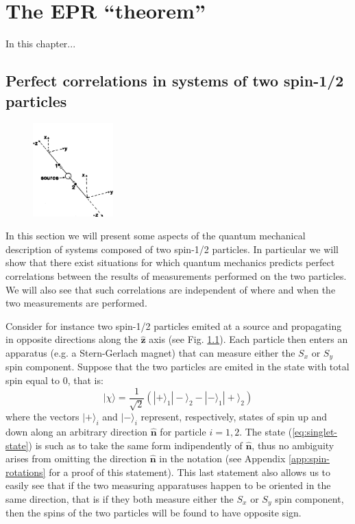 \chapter{The EPR ``theorem''}

In this chapter...

\section{Perfect correlations in systems of two spin-1/2 particles}

\begin{figure}
  \centering
  \includegraphics[width=0.275\textwidth]{Mainmatter/Chapter1/eprb-gedankenexperiment.png}
  \caption{}
  \label{fig:eprb-gedankenexperiment}
\end{figure}

In this section we will present some aspects of the quantum mechanical description of systems composed of two spin-1/2 particles. In particular we will show that there exist situations for which quantum mechanics predicts perfect correlations between the results of measurements performed on the two particles. We will also see that such correlations are independent of where and when the two measurements are performed.%

Consider for instance two spin-1/2 particles emited at a source and propagating in opposite directions along the $\mathbf{\hat{z}}$ axis (see Fig. \ref{fig:eprb-gedankenexperiment}).  Each particle then enters an apparatus (e.g. a Stern-Gerlach magnet) that can measure either the $S_x$ or $S_y$ spin component. Suppose that the two particles are emited in the state with total spin equal to $0$, that is:
\begin{equation}
  |\chi\rangle = \frac{1}{\sqrt{2}} \left( |+\rangle_1 |-\rangle_2 - |-\rangle_1 |+\rangle_2 \right)
  \label{eq:singlet-state}
\end{equation}
where the vectors $|+\rangle_i$ and $|-\rangle_i$ represent, respectively, states of spin up and down along an arbitrary direction $\mathbf{\hat{n}}$ for particle $i = 1, 2$. The state (\ref{eq:singlet-state}) is such as to take the same form indipendently of $\mathbf{\hat{n}}$, thus no ambiguity arises from omitting the direction $\mathbf{\hat{n}}$ in the notation (see Appendix \ref{app:spin-rotations} for a proof of this statement). This last statement also allows us to easily see that if the two measuring apparatuses happen to be oriented in the same direction, that is if they both measure either the $S_x$ or $S_y$ spin component, then the spins of the two particles will be found to have opposite sign.

